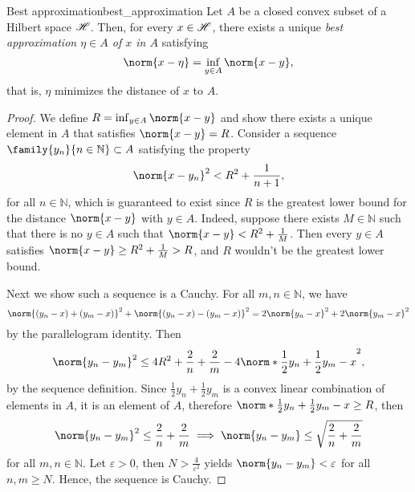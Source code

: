 \begin{theorem}{Best approximation}{best_approximation}
    Let \(A\) be a closed convex subset of a Hilbert space \(\mathscr{H}\). Then, for every \(x \in \mathscr{H}\), there exists a unique \emph{best approximation \(\eta \in A\) of \(x\) in \(A\)} satisfying
    \begin{equation*}
        \norm{x - \eta} = \inf_{y \in A}\norm{x - y},
    \end{equation*}
    that is, \(\eta\) minimizes the distance of \(x\) to \(A\).
\end{theorem}
\begin{proof}
    We define \(R = \inf_{y \in A}\norm{x - y}\) and show there exists a unique element in \(A\) that satisfies \(\norm{x - y} = R\). Consider a sequence \(\family{y_n}{n \in \mathbb{N}} \subset A\) satisfying the property
    \begin{equation*}
        \norm{x - y_n}^2 < R^2 + \frac1{n+1},
    \end{equation*}
    for all \(n \in \mathbb{N}\), which is guaranteed to exist since \(R\) is the greatest lower bound for the distance \(\norm{x - y}\) with \(y \in A\). Indeed, suppose there exists \(M \in \mathbb{N}\) such that there is no \(y \in A\) such that \(\norm{x - y} < R^2 + \frac{1}{M}\). Then every \(y \in A\) satisfies \(\norm{x - y} \geq R^2 + \frac{1}{M} > R\), and \(R\) wouldn't be the greatest lower bound.

    Next we show such a sequence is a Cauchy. For all \(m,n \in \mathbb{N}\), we have
    \begin{equation*}
        \norm{(y_n - x) + (y_m - x)}^2 + \norm{(y_n - x) - (y_m - x)}^2 = 2\norm{y_n - x}^2 + 2\norm{y_m - x}^2
    \end{equation*}
    by the parallelogram identity. Then
    \begin{equation*}
        \norm{y_n - y_m}^2 \leq 4R^2 + \frac2{n} + \frac{2}{m} - 4\norm*{\frac12y_n + \frac12y_m - x}^2,
    \end{equation*}
    by the sequence definition.
    Since \(\frac12 y_n + \frac12 y_m\) is a convex linear combination of elements in \(A\), it is an element of \(A\), therefore \(\norm*{\frac12 y_n + \frac12 y_m - x} \geq R\), then
    \begin{equation*}
        \norm{y_n - y_m}^2 \leq \frac{2}{n} + \frac{2}{m} \implies \norm{y_n - y_m} \leq \sqrt{\frac{2}{n} + \frac{2}{m}}
    \end{equation*}
    for all \(m,n \in \mathbb{N}\). Let \(\varepsilon > 0\), then \(N > \frac{4}{\varepsilon^2}\) yields \(\norm{y_n - y_m} < \varepsilon\) for all \(n,m \geq N\). Hence, the sequence is Cauchy.


\end{proof}
